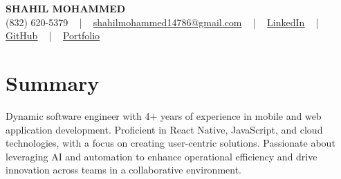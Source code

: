 \documentclass[letterpaper,10pt]{article}
\begin{document}
\begin{center}
    {\fontsize{14pt}{12pt}\selectfont \textbf{\MakeUppercase{Shahil Mohammed}}}\\ \vspace{2pt}
    \fontsize{10pt}{12pt}\selectfont (832) 620-5379 ~ | ~ \href{mailto:shahilmohammed14786@gmail.com}{shahilmohammed14786@gmail.com} ~ | ~  
    \href{https://www.linkedin.com/in/shahil-mohammed-9652931a1/}{\color{blue}\underline{LinkedIn}}  ~ | ~ 
    \href{https://github.com/freakbeast14}{\color{blue}\underline{GitHub}} ~ | ~ 
    \href{https://shahil-mohammed.netlify.app/}{\color{blue}\underline{Portfolio}}
    \vspace{-8pt}
\end{center}

\section{Summary}
\vspace{-2pt}\fontsize{8pt}{9pt}\selectfont
Dynamic software engineer with 4+ years of experience in mobile and web application development. Proficient in React Native, JavaScript, and cloud technologies, with a focus on creating user-centric solutions. Passionate about leveraging AI and automation to enhance operational efficiency and drive innovation across teams in a collaborative environment.
 \vspace{-5pt}
 
\vspace{-2pt}
\end{document}

